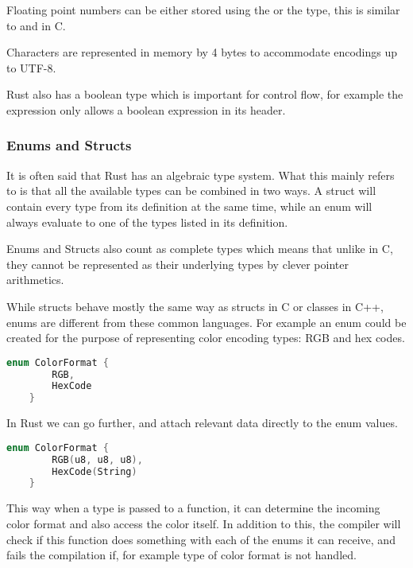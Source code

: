 Floating point numbers can be either stored using the  or the  type, this is similar to  and  in C.

Characters are represented in memory by 4 bytes to accommodate encodings up to UTF-8.

Rust also has a boolean type which is important for control flow, for example the  expression only allows a boolean expression in its header.

\subsubsection{Enums and Structs}

It is often said that Rust has an algebraic type system. What this mainly refers to is that all the available types can be combined in two ways. A struct will contain every type from its definition at the same time, while an enum will always evaluate to one of the types listed in its definition.

Enums and Structs also count as complete types which means that unlike in C, they cannot be represented as their underlying types by clever pointer arithmetics.

While structs behave mostly the same way as structs in C or classes in C++, enums are different from these common languages. For example an enum could be created for the purpose of representing color encoding types: RGB and hex codes.

\begin{lstlisting}[language=C,frame=single,float=!ht]
    enum ColorFormat {
        RGB,
        HexCode
    }
\end{lstlisting}

In Rust we can go further, and attach relevant data directly to the enum values.

\begin{lstlisting}[language=C,frame=single,float=!ht]
    enum ColorFormat {
        RGB(u8, u8, u8),
        HexCode(String)
    }
\end{lstlisting}

This way when a  type is passed to a function, it can determine the incoming color format and also access the color itself. In addition to this, the compiler will check if this function does something with each of the enums it can receive, and fails the compilation if, for example  type of color format is not handled.

